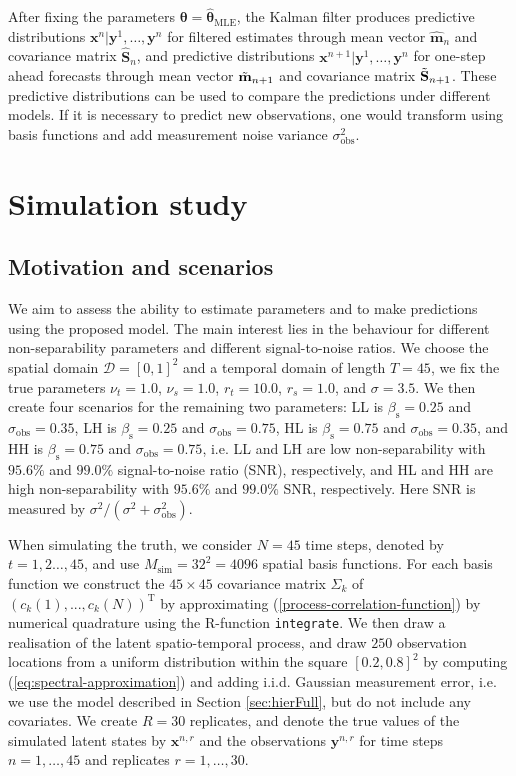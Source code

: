 \documentclass[12pt]{article} %
\begin{document}
After fixing the parameters $\boldsymbol{\theta} = \hat{\boldsymbol{\theta}}_{\mathrm{MLE}}$, the Kalman filter produces predictive distributions $\boldsymbol{x}^n|\boldsymbol{y}^1, \ldots, \boldsymbol{y}^n$ for filtered estimates  through mean vector $\hat{\mathbf{m}}_n$ and covariance matrix $\hat{\mathbf{S}}_n$, and predictive distributions $\boldsymbol{x}^{n+1}|\boldsymbol{y}^1, \ldots, \boldsymbol{y}^n$ for one-step ahead forecasts  through mean vector $\Tilde{\mathbf{m}}_{n+1}$ and covariance matrix $\Tilde{\mathbf{S}}_{n+1}$. These predictive distributions can be used to compare the predictions under different models. If it is necessary to predict new observations, one would transform using basis functions and add measurement noise variance $\sigma_{\mathrm{obs}}^2$.

\section{Simulation study}\label{sec:SimStudy}

\subsection{Motivation and scenarios}
\label{sec:SimStudy:Mot}
We aim to assess the ability to estimate parameters and to make predictions using the proposed model. The main interest lies in the behaviour for different non-separability parameters and different signal-to-noise ratios. We choose the spatial domain $\mathcal{D} = [0,1]^2$ and a temporal domain of length $T = 45$, we fix the true parameters $\nu_t = 1.0$, $\nu_s = 1.0$, $r_t = 10.0$, $r_s = 1.0$, and $\sigma = 3.5$. We then create four scenarios for the remaining two parameters: LL is $\beta_\mathrm{s} = 0.25$ and $\sigma_{\mathrm{obs}} = 0.35$, LH is $\beta_\mathrm{s} = 0.25$ and $\sigma_{\mathrm{obs}} = 0.75$, HL is $\beta_\mathrm{s} = 0.75$ and $\sigma_{\mathrm{obs}} = 0.35$, and HH is $\beta_\mathrm{s} = 0.75$ and $\sigma_{\mathrm{obs}} = 0.75$, i.e. LL and LH are low non-separability with $95.6\%$ and $99.0\%$ signal-to-noise ratio (SNR), respectively, and HL and HH are high non-separability with $95.6\%$ and $99.0\%$ SNR, respectively. Here SNR is measured by $\sigma^2/(\sigma^2+\sigma_{\mathrm{obs}}^2)$.

When simulating the truth, we consider $N = 45$ time steps, denoted by $t=1,2\ldots,45$, and use $M_{\mathrm{sim}}=32^2=4096$ spatial basis functions. For each basis function we construct the $45 \times 45$ covariance matrix $\Sigma_k$ of $(c_k(1), ..., c_k(N))^\mathrm{T}$ by approximating (\ref{process-correlation-function}) by numerical quadrature using the R-function \verb|integrate|. 
We then draw a realisation of the latent spatio-temporal process, and draw $250$ observation locations from a uniform distribution within the square $[0.2, 0.8]^2$ by computing (\ref{eq:spectral-approximation}) and adding i.i.d. Gaussian measurement error, i.e. we use the model described in Section \ref{sec:hierFull}, but do not include any covariates. We create $R = 30$ replicates, and denote the true values of the simulated latent states by $\boldsymbol{x}^{n,r}$ and the observations $\boldsymbol{y}^{n,r}$ for time steps $n = 1,\ldots, 45$ and replicates $r = 1, \ldots, 30$.
\end{document}
